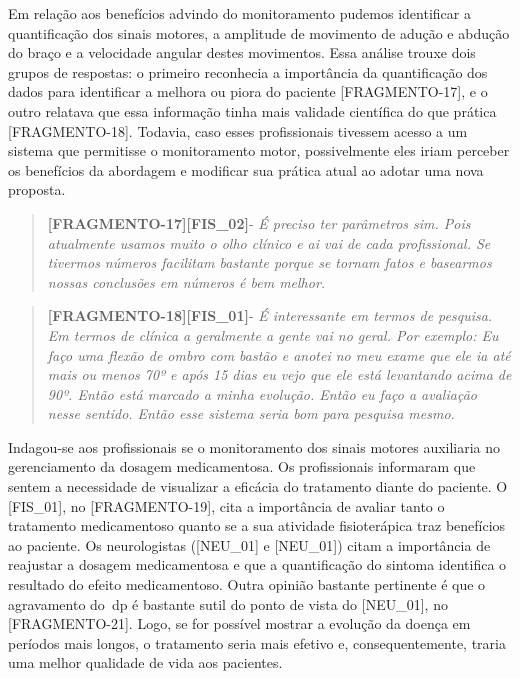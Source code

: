 Em relação aos benefícios advindo do monitoramento pudemos identificar a quantificação dos sinais motores, a amplitude de movimento de adução e abdução do braço e a velocidade angular destes movimentos. Essa análise trouxe dois grupos de respostas: o primeiro reconhecia a importância da quantificação dos dados para identificar a melhora ou piora do paciente [FRAGMENTO-17], e o outro relatava que essa informação tinha mais validade científica do que prática [FRAGMENTO-18]. Todavia, caso esses profissionais tivessem acesso a um sistema que permitisse o monitoramento motor, possivelmente eles iriam perceber os benefícios da abordagem e modificar sua prática atual ao adotar uma nova proposta.

\begin{quote}
\textbf{[FRAGMENTO-17][FIS\_02]}-
\emph{
É preciso ter parâmetros sim. Pois atualmente usamos muito o olho clínico e ai vai de cada profissional. Se tivermos números facilitam bastante porque se tornam fatos e basearmos nossas conclusões em números é bem melhor.
}
\end{quote}

\begin{quote}
\textbf{[FRAGMENTO-18][FIS\_01]}-
\emph{
É interessante em termos de pesquisa. Em termos de clínica a geralmente a gente vai no geral. Por exemplo: Eu faço uma flexão de ombro com bastão e anotei no meu exame que ele ia até mais ou menos 70º e após 15 dias eu vejo que ele está levantando acima de 90º. Então está marcado a minha evolução. Então eu faço a avaliação nesse sentido. Então esse sistema seria bom para pesquisa mesmo.
}
\end{quote}

Indagou-se aos profissionais se o monitoramento dos sinais motores auxiliaria no gerenciamento da dosagem medicamentosa. Os profissionais informaram que sentem a necessidade de visualizar a eficácia do tratamento diante do paciente. O [FIS\_01], no [FRAGMENTO-19], cita a importância de avaliar tanto o tratamento medicamentoso quanto se a sua atividade fisioterápica traz benefícios ao paciente. Os neurologistas ([NEU\_01] e [NEU\_01]) citam a importância de reajustar a dosagem medicamentosa e que a quantificação do sintoma identifica o resultado do efeito medicamentoso. Outra opinião bastante pertinente é que o agravamento do~\ac{dp} é bastante sutil do ponto de vista do [NEU\_01], no [FRAGMENTO-21]. Logo, se for possível mostrar a evolução da doença em períodos mais longos, o tratamento seria mais efetivo e, consequentemente, traria uma melhor qualidade de vida aos pacientes.

